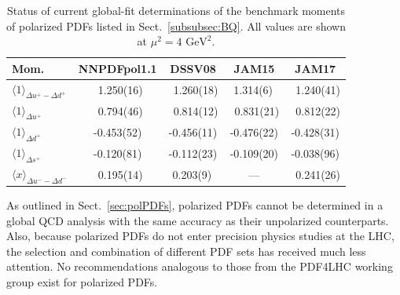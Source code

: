 \begin{table}[!t]
\centering
\renewcommand{\arraystretch}{1.2}
\begin{tabular}{lcccc}
\toprule
Mom. 
& NNPDFpol1.1 & DSSV08 & JAM15 & JAM17 \\
\midrule
$\langle 1 \rangle_{\Delta u^+-\Delta d^+}$ &
\ 1.250(16) & \ 1.260(18) & 1.314(6)\,  & \ 1.240(41)\\
$\langle 1 \rangle_{\Delta u^+}$ &
\ 0.794(46) & \ 0.814(12) & \ 0.831(21) & \ 0.812(22)\\
$\langle 1 \rangle_{\Delta d^+}$ &  
-0.453(52)  &  -0.456(11) &  -0.476(22) &  -0.428(31)\\
$\langle 1 \rangle_{\Delta s^+}$ &  
-0.120(81)  &  -0.112(23) &  -0.109(20) &  -0.038(96)\\
$\langle x \rangle_{\Delta u^- - \Delta d^-}$ &     
\ 0.195(14) &  0.203(9)\, &  ---        & \ 0.241(26)\\
\bottomrule
\end{tabular}
\caption{\small Status of current global-fit determinations of the 
benchmark moments of polarized PDFs listed in Sect.~\ref{subsubsec:BQ}.
All values are shown at $\mu^2=4\mbox{ GeV}^2$.}
\label{tab:polPDFmoms}
\end{table}

As outlined in Sect.~\ref{sec:polPDFs}, polarized PDFs cannot be determined in 
a global QCD analysis with the same accuracy as their unpolarized counterparts.
%
Also, because polarized PDFs do not enter precision physics studies at the LHC, 
the selection and combination of different PDF sets has received much less
attention.
%
No recommendations analogous to those from the PDF4LHC working group
exist for polarized PDFs.

